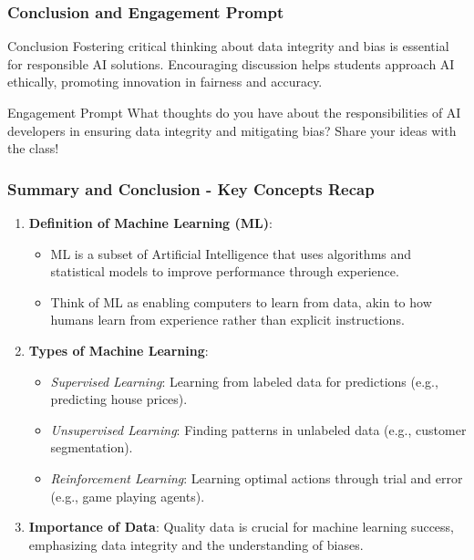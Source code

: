 \documentclass[aspectratio=169]{beamer}
\begin{document}
\begin{frame}[fragile]
    \frametitle{Conclusion and Engagement Prompt}
    \begin{block}{Conclusion}
        Fostering critical thinking about data integrity and bias is essential for responsible AI solutions. Encouraging discussion helps students approach AI ethically, promoting innovation in fairness and accuracy.
    \end{block}
    
    \begin{block}{Engagement Prompt}
        What thoughts do you have about the responsibilities of AI developers in ensuring data integrity and mitigating bias? Share your ideas with the class!
    \end{block}
\end{frame}

\begin{frame}[fragile]
    \frametitle{Summary and Conclusion - Key Concepts Recap}
    
    \begin{enumerate}
        \item \textbf{Definition of Machine Learning (ML)}: 
        \begin{itemize}
            \item ML is a subset of Artificial Intelligence that uses algorithms and statistical models to improve performance through experience.
            \item Think of ML as enabling computers to learn from data, akin to how humans learn from experience rather than explicit instructions.
        \end{itemize}
        
        \item \textbf{Types of Machine Learning}:
        \begin{itemize}
            \item \textit{Supervised Learning}: Learning from labeled data for predictions (e.g., predicting house prices).
            \item \textit{Unsupervised Learning}: Finding patterns in unlabeled data (e.g., customer segmentation).
            \item \textit{Reinforcement Learning}: Learning optimal actions through trial and error (e.g., game playing agents).
        \end{itemize}
        
        \item \textbf{Importance of Data}: Quality data is crucial for machine learning success, emphasizing data integrity and the understanding of biases.
    \end{enumerate}
\end{frame}
\end{document}
